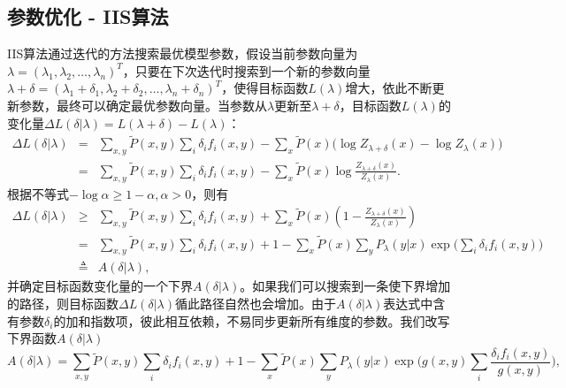 \subsection{参数优化 - IIS算法}
IIS算法通过迭代的方法搜索最优模型参数，假设当前参数向量为$\lambda=(\lambda_1,\lambda_2,\ldots,\lambda_n)^T$，只要在下次迭代时搜索到一个新的参数向量$\lambda+\delta=(\lambda_1+\delta_1, \lambda_2+\delta_2,\ldots, \lambda_n+\delta_n)^T$，使得目标函数$L(\lambda)$增大，依此不断更新参数，最终可以确定最优参数向量。当参数从$\lambda$更新至$\lambda+\delta$，目标函数$L(\lambda)$的变化量$\Delta L(\delta|\lambda) = L(\lambda+\delta) - L(\lambda)$：
\begin{equation}
    \begin{array}{lcl}
         \Delta L(\delta|\lambda) &=& \sum\limits_{x,y} \tilde P(x,y) \sum\limits_i \delta_i f_i(x,y)-\sum\limits_x \tilde P(x) \Big(\log Z_{\lambda+\delta}(x) - \log Z_\lambda(x) \Big)\\
        &=& \sum\limits_{x,y} \tilde P(x,y) \sum\limits_i \delta_i f_i(x,y)-\sum\limits_x \tilde P(x) \log \frac{Z_{\lambda+\delta}(x)}{Z_\lambda(x)}.
    \end{array}
\end{equation}
根据不等式$-\log \alpha \ge 1 - \alpha, \alpha > 0$，则有
\begin{equation}
    \begin{array}{lcl}
    \Delta L(\delta|\lambda) &\ge& \sum\limits_{x,y} \tilde P(x,y) \sum\limits_i \delta_i f_i(x,y)+\sum\limits_x \tilde P(x) (1-\frac{Z_{\lambda+\delta}(x)}{Z_\lambda(x)})\\
    & = & \sum\limits_{x,y} \tilde P(x,y) \sum\limits_i \delta_i f_i(x,y) + 1 - \sum\limits_x \tilde P(x) \sum\limits_y P_\lambda(y|x) \exp\Big(\sum\limits_i \delta_i f_i(x,y)\Big)\\
    & \triangleq & A(\delta|\lambda),
    \end{array}
\end{equation}
并确定目标函数变化量的一个下界$A(\delta|\lambda)$。如果我们可以搜索到一条使下界增加的路径，则目标函数$\Delta L(\delta|\lambda)$循此路径自然也会增加。由于$A(\delta|\lambda)$表达式中含有参数$\delta_i$的加和指数项，彼此相互依赖，不易同步更新所有维度的参数。我们改写下界函数$A(\delta|\lambda)$
\begin{equation}
    A(\delta|\lambda) = \sum\limits_{x,y} \tilde P(x,y) \sum\limits_i \delta_i f_i(x,y) + 1 - \sum\limits_x \tilde P(x) \sum\limits_y P_\lambda(y|x) \exp\Big(g(x,y) \sum\limits_i \frac{\delta_i f_i(x,y)}{g(x,y)}\Big),
\end{equation}
